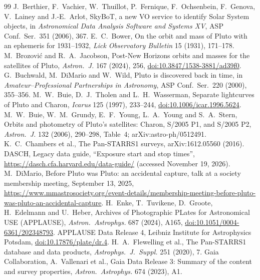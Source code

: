 \documentclass[11pt]{article}
\begin{document}
\begin{thebibliography}{99}
 J.~Berthier, F.~Vachier, W.~Thuillot, P.~Fernique, F.~Ochsenbein, F.~Genova, V.~Lainey and J.-E.~Arlot, SkyBoT, a new VO service to identify Solar System objects, in \emph{Astronomical Data Analysis Software and Systems XV}, ASP Conf.\ Ser.\ 351 (2006), 367.
 E.~C.~Bower, On the orbit and mass of Pluto with an ephemeris for 1931--1932, \emph{Lick Observatory Bulletin} 15 (1931), 171--178.
 M.~Brozović and R.~A.~Jacobson, Post-New Horizons orbits and masses for the satellites of Pluto, \emph{Astron.\ J.} 167 (2024), 256, \href{https://doi.org/10.3847/1538-3881/ad39f0}{doi:10.3847/1538-3881/ad39f0}.
 G.~Buchwald, M.~DiMario and W.~Wild, Pluto is discovered back in time, in \emph{Amateur--Professional Partnerships in Astronomy}, ASP Conf.\ Ser.\ 220 (2000), 355--356.
 M.~W.~Buie, D.~J.~Tholen and L.~H.~Wasserman, Separate lightcurves of Pluto and Charon, \emph{Icarus} 125 (1997), 233--244, \href{https://doi.org/10.1006/icar.1996.5624}{doi:10.1006/icar.1996.5624}.
 M.~W.~Buie, W.~M.~Grundy, E.~F.~Young, L.~A.~Young and S.~A.~Stern, Orbits and photometry of Pluto's satellites: Charon, S/2005 P1, and S/2005 P2, \emph{Astron.\ J.} 132 (2006), 290--298, Table~4; arXiv:astro-ph/0512491.
 K.~C.~Chambers et al., The Pan-STARRS1 surveys, arXiv:1612.05560 (2016).
 DASCH, Legacy data guide, ``Exposure start and stop times'', \url{https://dasch.cfa.harvard.edu/data-guide/} (accessed November 19, 2026).
 M.~DiMario, Before Pluto was Pluto: an accidental capture, talk at a society membership meeting, September 13, 2025, \url{https://www.mmastrosociety.org/event-details/membership-meeting-before-pluto-was-pluto-an-accidental-capture}.
 H.~Enke, T.~Tuvikene, D.~Groote, H.~Edelmann and U.~Heber, Archives of Photographic PLates for Astronomical USE (APPLAUSE), \emph{Astron.\ Astrophys.} 687 (2024), A165, \href{https://doi.org/10.1051/0004-6361/202348793}{doi:10.1051/0004-6361/202348793}.
 APPLAUSE Data Release 4, Leibniz Institute for Astrophysics Potsdam, \href{https://doi.org/10.17876/plate/dr.4}{doi:10.17876/plate/dr.4}.
 H.~A.~Flewelling et al., The Pan-STARRS1 database and data products, \emph{Astrophys.\ J.\ Suppl.} 251 (2020), 7.
 Gaia Collaboration, A.~Vallenari et al., Gaia Data Release 3: Summary of the content and survey properties, \emph{Astron.\ Astrophys.} 674 (2023), A1.

\end{thebibliography}
\end{document}
